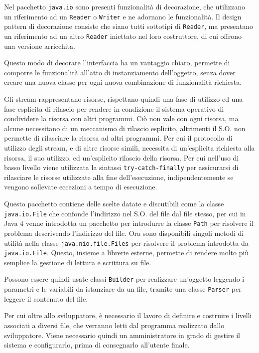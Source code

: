 \documentclass{article}
\numberwithin{equation}{subsection}
\begin{document}
Nel pacchetto \verb|java.io| sono presenti funzionalità di decorazione, che utilizzano un riferimento ad un \verb|Reader| o \verb|Writer| e ne adornano le funzionalità. 
Il design pattern di decorazione consiste che siano tutti sottotipi di \verb|Reader|, ma presentano un riferimento ad un altro \verb|Reader| iniettato nel loro costruttore, di cui 
offrono una versione arricchita. 

Questo modo di decorare l'interfaccia ha un vantaggio chiaro, permette di comporre le funzionalità all'atto di instanziamento dell'oggetto, senza dover creare una nuova classe 
per ogni nuova combinazione di funzionalità richiesta. 

Gli stream rappresentano risorse, rispettano quindi una fase di utilizzo ed una fase esplicita di rilascio per rendere in condizione il sistema operativo di condividere la 
risorsa con altri programmi. 
Ciò non vale con ogni risorsa, ma alcune necessitano di un meccanismo di rilascio esplicito, altrimenti il S.O. non permette di rilasciare la risorsa ad altri programmi. 
Per cui il protocollo di utilizzo degli stream, e di altre risorse simili, necessita di un'esplicita richiesta alla risorsa, il suo utilizzo, ed un'esplicito rilascio 
della risorsa. 
Per cui nell'uso di basso livello viene utilizzata la sintassi \verb|try-catch-finally| per assicurarsi di rilasciare le risorse utilizzate alla fine dell'esecuzione, 
indipendentemente se vengono sollevate eccezioni a tempo di esecuzione. 

Questo pacchetto contiene delle scelte datate e discutibili come la classe \verb|java.io.File| che confonde l'indirizzo nel S.O. del file dal file stesso, per cui in Java 4 
venne introdotta un pacchetto per introdurre la classe \verb|Path| per risolvere il problema descrivendo l'indirizzo del file. 
Ora sono disponibili singoli metodi di utilità nella classe \verb|java.nio.file.Files| per risolvere il problema introdotta da \verb|java.io.File|. Questo, insieme a librerie 
esterne, permette di rendere molto più semplice la gestione di lettura e scrittura su file. 


Possono essere quindi usate classi \verb|Builder| per realizzare un'oggetto leggendo i parametri e le variabili da istanziare da un file, tramite una classe \verb|Parser| per 
leggere il contenuto del file. 

Per cui oltre allo sviluppatore, è necessario il lavoro di definire e costruire i livelli associati a diversi file, che verranno letti dal programma realizzato dallo 
sviluppatore. Viene necessario quindi un amministratore in grado di gestire il sistema e configurarlo, prima di consegnarlo all'utente finale. 
\end{document}
